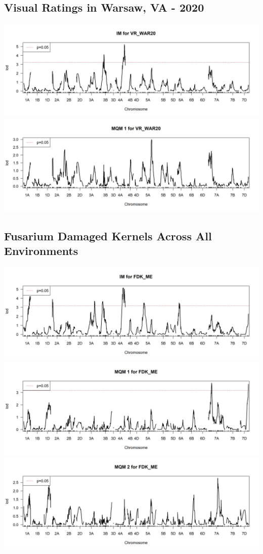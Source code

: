 \documentclass[
]{article}
\begin{document}
\subsection{Visual Ratings in Warsaw, VA -
2020}\label{visual-ratings-in-warsaw-va---2020}

\includegraphics{Scan_IM_VR_WAR20.jpg}
\includegraphics{Scan_MQM1_VR_WAR20.jpg} \pagebreak

\subsection{Fusarium Damaged Kernels Across All
Environments}\label{fusarium-damaged-kernels-across-all-environments}

\includegraphics{Scan_IM_FDK_ME.jpg}
\includegraphics{Scan_MQM1_FDK_ME.jpg}
\includegraphics{Scan_MQM2_FDK_ME.jpg} \pagebreak
\end{document}
